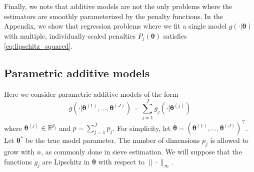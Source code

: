 \documentclass[12pt]{article}
\begin{document}

Finally, we note that additive models are not the only problems where the estimators are smoothly parameterized by the penalty functions. In the Appendix, we show that regression problems where we fit a single model $g(\cdot | \boldsymbol{\theta})$ with multiple, individually-scaled penalties $P_j(\boldsymbol{\theta})$ satisfies \eqref{eq:lipschitz_squared}.

\subsection{Parametric additive models}
\label{sec:param_add_models}

Here we consider parametric additive models of the form
\begin{equation}
g(\cdot | \boldsymbol{\theta}^{(1)}, ..., \boldsymbol{\theta}^{(J)}) = \sum_{j=1}^J g_j(\cdot | \boldsymbol{\theta}^{(j)})
\end{equation}
where $\boldsymbol{\theta}^{(j)} \in \mathbb{R}^{p_j}$ and $p = \sum_{j=1}^J p_j$. For simplicity, let $\boldsymbol{\theta} = \left (\boldsymbol{\theta}^{(1)}, ..., \boldsymbol{\theta}^{(J)} \right )^\top$. Let $\boldsymbol{\theta}^*$ be the true model parameter. The number of dimensions $p_j$ is allowed to grow with $n$, as commonly done in sieve estimation. We will suppose that the functions $g_j$ are Lipschitz in $\boldsymbol{\theta}$ with respect to $\| \cdot \|_\infty$.
\end{document}
